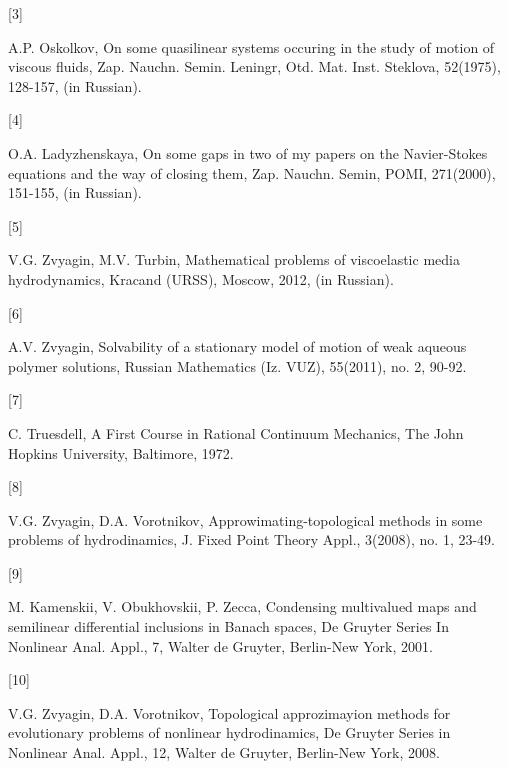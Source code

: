 \hypertarget{L3}{[3]} A.P. Oskolkov, On some quasilinear systems occuring in the study of motion of viscous fluids,
Zap. Nauchn. Semin. Leningr, Otd. Mat. Inst. Steklova, 52(1975), 128-157, (in Russian).

\hypertarget{L4}{[4]} O.A. Ladyzhenskaya, On some gaps in two of my papers on the Navier-Stokes equations and
the way of closing them, Zap. Nauchn. Semin, POMI, 271(2000), 151-155, (in Russian).

\hypertarget{L5}{[5]} V.G. Zvyagin, M.V. Turbin, Mathematical problems of viscoelastic media hydrodynamics, Kracand (URSS),
Moscow, 2012, (in Russian).

\hypertarget{L6}{[6]} A.V. Zvyagin, Solvability of a stationary model of motion of weak aqueous polymer solutions,
Russian Mathematics (Iz. VUZ), 55(2011), no. 2, 90-92.

\hypertarget{L7}{[7]} C. Truesdell, A First Course in Rational Continuum Mechanics, The John Hopkins University,
Baltimore, 1972.

\hypertarget{L8}{[8]} V.G. Zvyagin, D.A. Vorotnikov, Approwimating-topological methods in some problems of hydrodinamics,
J. Fixed Point Theory Appl., 3(2008), no. 1, 23-49.

\hypertarget{L9}{[9]} M. Kamenskii, V. Obukhovskii, P. Zecca, Condensing multivalued maps and semilinear differential
inclusions in Banach spaces, De Gruyter Series In Nonlinear Anal. Appl., 7, Walter de Gruyter, Berlin-New York, 2001.

\hypertarget{L10}{[10]} V.G. Zvyagin, D.A. Vorotnikov, Topological approzimayion methods for evolutionary problems
of nonlinear hydrodinamics, De Gruyter Series in Nonlinear Anal. Appl., 12, Walter de Gruyter, Berlin-New York, 2008.
